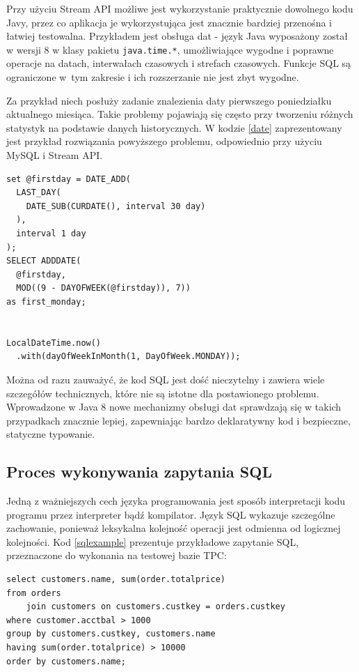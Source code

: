 \documentclass[12pt,twoside,openright]{extarticle}
\begin{document}
    Przy użyciu Stream API możliwe jest wykorzystanie praktycznie dowolnego kodu Javy, przez co aplikacja je wykorzystująca jest znacznie bardziej przenośna i łatwiej testowalna. Przykładem jest obsługa dat - język Java wyposażony został w wersji 8 w klasy pakietu \texttt{java.time.*}, umożliwiające wygodne i poprawne operacje na datach, interwałach czasowych i strefach czasowych. Funkcje SQL są ograniczone w~tym zakresie i ich rozszerzanie nie jest zbyt wygodne.

    Za przykład niech posłuży zadanie znalezienia daty pierwszego poniedziałku aktualnego miesiąca. Takie problemy pojawiają się często przy tworzeniu różnych statystyk na podstawie danych historycznych. W kodzie \ref{date} zaprezentowany jest przykład rozwiązania powyższego problemu, odpowiednio przy użyciu MySQL i Stream API.
    

\begin{lstlisting}[label=date, caption=Problem znalezienia pierwszego poniedziałku w miesiącu]
set @firstday = DATE_ADD(
  LAST_DAY(
    DATE_SUB(CURDATE(), interval 30 day)
  ),
  interval 1 day
);
SELECT ADDDATE(
  @firstday,
  MOD((9 - DAYOFWEEK(@firstday)), 7))
as first_monday;


LocalDateTime.now()
  .with(dayOfWeekInMonth(1, DayOfWeek.MONDAY));
\end{lstlisting}

Można od razu zauważyć, że kod SQL jest dość nieczytelny i zawiera wiele szczegółów technicznych, które nie są istotne dla postawionego problemu. Wprowadzone w Java 8 nowe mechanizmy obsługi dat sprawdzają się w takich przypadkach znacznie lepiej, zapewniając bardzo deklaratywny kod i bezpieczne, statyczne typowanie.


\subsection{Proces wykonywania zapytania SQL}

    Jedną z ważniejszych cech języka programowania jest sposób interpretacji kodu programu przez interpreter bądź kompilator. Język SQL wykazuje szczególne zachowanie, ponieważ leksykalna kolejność operacji jest odmienna od logicznej kolejności. Kod \ref{sqlexample} prezentuje przykładowe zapytanie SQL, przeznaczone do wykonania na testowej bazie TPC:


\begin{lstlisting}[label=sqlexample, caption=Przykład kolejności wykonywania zapytania SQL]
select customers.name, sum(order.totalprice)
from orders 
    join customers on customers.custkey = orders.custkey
where customer.acctbal > 1000
group by customers.custkey, customers.name
having sum(order.totalprice) > 10000
order by customers.name;
\end{lstlisting}
\end{document}
